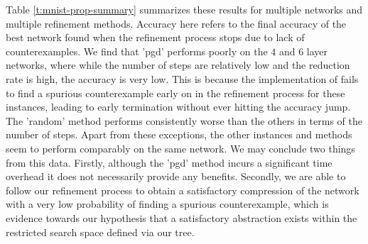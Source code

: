 Table \ref{t:mnist-prop-summary} summarizes these results for multiple \mnist
networks and multiple refinement methods. Accuracy here refers to the final
accuracy of the best network found when the refinement process stops due to lack
of counterexamples. We find that 'pgd' performs poorly on the $4$ and $6$ layer
networks, where while the number of steps are relatively low and the reduction
rate is high, the accuracy is very low. This is because the \abcrown
implementation of \pgd fails to find a spurious counterexample early on in the
refinement process for these instances, leading to early termination without
ever hitting the accuracy jump. The 'random' method performs consistently worse
than the others in terms of the number of steps. Apart from these exceptions,
the other instances and methods seem to perform comparably on the same network.
We may conclude two things from this data. Firstly, although the 'pgd' method
incurs a significant time overhead  it does not necessarily
provide any benefits. Secondly, we are able to follow our refinement process
to obtain a satisfactory compression of the network with a very low probability
of finding a spurious counterexample, which is evidence towards our hypothesis
that a satisfactory abstraction exists within the restricted search space
defined via our tree.
